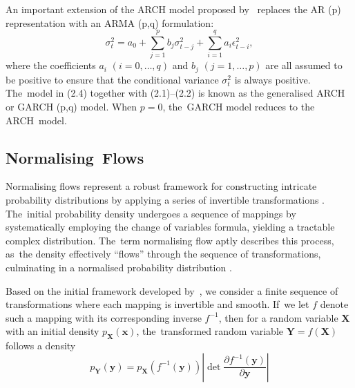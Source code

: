 \documentclass[risks,article,accept,pdftex,moreauthors]{Definitions/mdpi}
\begin{document}
An important extension of the ARCH model proposed by~\cite{bollerslev1986generalised} replaces the AR (p) representation with an ARMA (p,q) formulation:
\begin{equation}
\sigma_t^2 = a_0 + \sum_{j=1}^p b_j \sigma_{t-j}^2 + \sum_{i=1}^q a_i \epsilon_{t-i}^2, 
\end{equation}
where the coefficients \(a_i\) \((i=0,\ldots,q)\) and \(b_j\) \((j=1,\ldots,p)\) are all assumed to be positive to ensure that the conditional variance \(\sigma_t^2\) is always positive. The~model in (2.4) together with (2.1)--(2.2) is known as the generalised ARCH or GARCH (p,q) model. When \(p=0\), the~GARCH model reduces to the ARCH~model.



\subsection{Normalising~Flows}

Normalising flows represent a robust framework for constructing intricate probability distributions by applying a series of invertible transformations \citep{rezende2015variational, mongwe2025analyzing}. The~initial probability density undergoes a sequence of mappings by systematically employing the change of variables formula, yielding a tractable complex distribution. The~term normalising flow aptly describes this process, as~the density effectively ``flows'' through the sequence of transformations, culminating in a normalised probability distribution \citep{rezende2015variational}.

Based on the initial framework developed by~\cite{rezende2015variational}, we consider a finite sequence of transformations where each mapping is invertible and smooth. If~we let \( f \) denote such a mapping with its corresponding inverse \( f^{-1} \), then for a random variable \(\mathbf{X}\) with an initial density \( p_\mathbf{X}(\mathbf{x}) \), the~transformed random variable \(\mathbf{Y} = f(\mathbf{X})\) follows a density
\begin{equation}
p_\mathbf{Y}(\mathbf{y}) = p_\mathbf{X}\left(f^{-1}(\mathbf{y})\right) \left|\det \frac{\partial f^{-1}(\mathbf{y})}{\partial \mathbf{y}}\right|
\end{equation}
\end{document}
